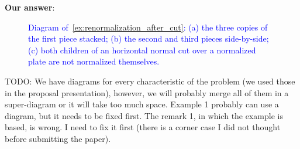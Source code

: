 \documentclass[smallextended]{svjour3}       %
\makeatletter
\newif\iffinalversion
\newcommand{\newtext}[1]{\iffinalversion%
#1%
\else%
\textcolor{blue}{#1}%
\fi%
}
\newcommand\gobblepars{%
    \@ifnextchar\par%
        {\expandafter\gobblepars\@gobble}%
        {}}
\newcounter{answer}
\newenvironment{answer}{%
    \refstepcounter{answer}\par\smallskip\noindent%
    \textbf{Our answer}: \gobblepars}%
    {\unskip\bigskip}
\makeatother
\begin{document}
\begin{answer}
\begin{figure}[ht]
\caption{\newtext{Diagram of~\autoref{ex:renormalization_after_cut}: (a) the three copies of the first piece stacked; (b) the second and third pieces side-by-side; (c) both children of an horizontal normal cut over a normalized plate are not normalized themselves.}}
\end{figure}
TODO: We have diagrams for every characteristic of the problem (we used those in the proposal presentation), however, we will probably merge all of them in a super-diagram or it will take too much space. Example 1 probably can use a diagram, but it needs to be fixed first. The remark 1, in which the example is based, is wrong. I need to fix it first (there is a corner case I did not thought before submitting the paper).
\end{answer}
\end{document}
